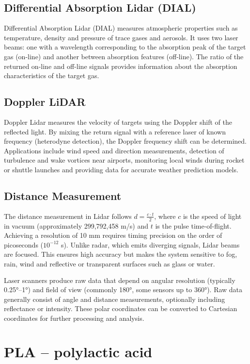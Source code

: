 \documentclass[english, bachelor, utf8]{base/thesis_telematics}
\begin{document}
\subsection*{Differential Absorption Lidar (DIAL)}
Differential Absorption Lidar (DIAL) measures atmospheric properties such as temperature, density and
pressure of trace gases and aerosols. It uses two laser beams: one with a wavelength corresponding to the
absorption peak of the target gas (on-line) and another between absorption features (off-line). The ratio
of the returned on-line and off-line signals provides information about the absorption characteristics of
the target gas.
\subsection*{Doppler LiDAR}
Doppler Lidar measures the velocity of targets using the Doppler shift of the reflected light. By mixing
the return signal with a reference laser of known frequency (heterodyne detection), the Doppler frequency
shift can be determined. Applications include wind speed and direction measurements, detection of turbulence
and wake vortices near airports, monitoring local winds during rocket or shuttle launches and providing
data for accurate weather prediction models.

\subsection*{Distance Measurement}
The distance measurement in Lidar follows \( d = \frac{c \cdot t}{2} \), where \(c\) is the speed of light
in vacuum (approximately 299,792,458 m/s) and \(t\) is the pulse time-of-flight. Achieving a resolution of
10 mm requires timing precision on the order of picoseconds (\(10^{-12}\) s). Unlike radar, which emits
diverging signals, Lidar beams are focused. This ensures high accuracy but makes the system sensitive to
fog, rain, wind and reflective or transparent surfaces such as glass or water.

Laser scanners produce raw data that depend on angular resolution (typically 0.25°–1°) and field of view
(commonly 180°, some sensors up to 360°). Raw data generally consist of angle and distance measurements,
optionally including reflectance or intensity. These polar coordinates can be converted to Cartesian
coordinates for further processing and analysis.~\cite{michaelbleier_slides}

\section{PLA -- polylactic acid}
\label{sec:PLA}
\end{document}
